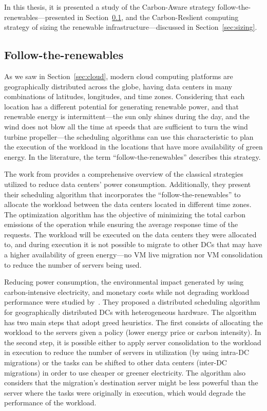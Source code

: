 In this thesis, it is presented a study of the Carbon-Aware strategy follow-the-renewables---presented in Section~\ref{sec:followtherenewables}, and the Carbon-Reslient computing strategy of sizing the renewable infrastructure---discussed in Section~\ref{sec:sizing}.

\subsection{Follow-the-renewables}

\label{sec:followtherenewables}

As we saw in Section~\ref{sec:cloud}, modern cloud computing platforms are geographically distributed across the globe, having data centers in many combinations of latitudes, longitudes, and time zones. Considering that each location has a different potential for generating renewable power, and that renewable energy is intermittent---the sun only shines during the day, and the wind does not blow all the time at speeds that are sufficient to turn the wind turbine propeller---the scheduling algorithms can use this characteristic to plan the execution of the workload in the locations that have more availability of green energy. In the literature, the term ``follow-the-renewables'' \cite{shuja2016sustainable} describes this strategy. 


The work from \citet{XU2020191} provides a comprehensive overview of the classical strategies utilized to reduce data centers' power consumption. Additionally, they present their scheduling algorithm that incorporates the ``follow-the-renewables'' to allocate the workload between the data centers located in different time zones. The optimization algorithm has the objective of minimizing the total carbon emissions of the operation while ensuring the average response time of the requests. The workload will be executed on the data centers they were allocated to, and during execution it is not possible to migrate to other DCs that may have a higher availability of green energy---no VM live migration nor VM consolidation to reduce the number of servers being used.



Reducing power consumption, the environmental impact generated by using carbon-intensive electricity, and monetary costs while not degrading workload performance were studied by~\citet{ALI2021110907}. They proposed a distributed scheduling algorithm for geographically distributed DCs with heterogeneous hardware. The algorithm has two main steps that adopt greed heuristics. The first consists of allocating the workload to the servers given a policy (lower energy price or carbon intensity). In the second step, it is possible either to apply server consolidation to the workload in execution to reduce the number of servers in utilization (by using intra-DC migrations) or the tasks can be shifted to other data centers (inter-DC migrations) in order to use cheaper or greener electricity. The algorithm also considers that the migration's destination server might be less powerful than the server where the tasks were originally in execution, which would degrade the performance of the workload.

